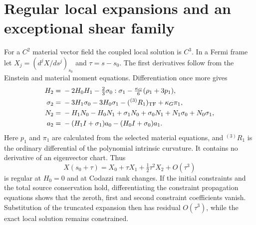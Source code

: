 \section{Regular local expansions and an exceptional shear family}

For a $C^2$ material vector field the coupled local solution is $C^3$. In a Fermi frame let $X_j=(d^jX/ds^j)_{s_0}$ and $\tau=s-s_0$. The first derivatives follow from the Einstein and material moment equations. Differentiation once more gives
\begin{align}
 H_2={}&-2H_0H_1-\tfrac23\sigma_0:\sigma_1
                       -\tfrac{\kappa_G}{6}(\rho_1+3p_1),\nonumber\\
 \sigma_2={}&-3H_1\sigma_0-3H_0\sigma_1
                           -({}^{(3)}R_1)_{\rm TF}+\kappa_G\pi_1,\nonumber\\
 N_2={}&-H_1N_0-H_0N_1+\sigma_1N_0+\sigma_0N_1
                                  +N_1\sigma_0+N_0\sigma_1,\nonumber\\
 a_2={}&-(H_1I+\sigma_1)a_0-(H_0I+\sigma_0)a_1.
 \label{geo:second_derivatives}
\end{align}
Here $p_1$ and $\pi_1$ are calculated from the selected material equations, and ${}^{(3)}R_1$ is the ordinary differential of the polynomial intrinsic curvature. It contains no derivative of an eigenvector chart. Thus
\begin{equation}
 X(s_0+\tau)=X_0+\tau X_1+\tfrac12\tau^2X_2+O(\tau^3)
 \label{geo:local_expansion}
\end{equation}
is regular at $H_0=0$ and at Codazzi rank changes. If the initial constraints and the total source conservation hold, differentiating the constraint propagation equations shows that the zeroth, first and second constraint coefficients vanish. Substitution of the truncated expansion then has residual $O(\tau^3)$, while the exact local solution remains constrained.


